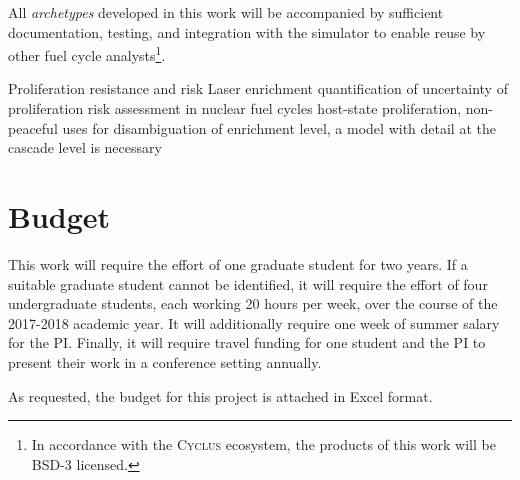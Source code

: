 \documentclass[letterpaper]{article}
\newcommand{\Cyclus}{\textsc{Cyclus}\xspace}%
\begin{document}
All \emph{archetypes} developed in this work will be accompanied by sufficient documentation, testing, and integration with the simulator to enable reuse by other fuel cycle analysts\footnote{In accordance with the \Cyclus ecosystem, the products of this work will be BSD-3 licensed.}.


\cite{case_proliferation_2011}
Proliferation resistance and risk
Laser enrichment
quantification of uncertainty of proliferation risk assessment in nuclear fuel cycles
host-state proliferation, non-peaceful uses
for disambiguation of enrichment level, a model with detail at the cascade level is necessary



\section{Budget}
This work will require the effort of one graduate student for two years. If a 
suitable graduate student cannot be identified, it will require the effort of 
four undergraduate students, each working 20 hours per week, over the course of 
the 2017-2018 academic year. It will additionally require one week of summer 
salary for the PI. Finally, it will require travel funding for one 
student and the PI to present their work in a conference setting annually. 

As requested, the budget for this project is attached in Excel format.



\end{document}

